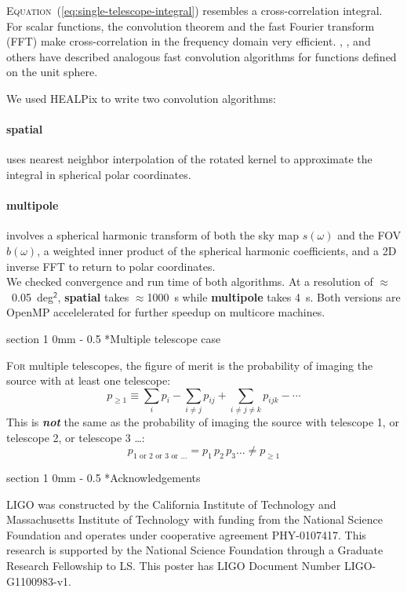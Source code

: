 \documentclass[portrait]{a0poster}
\makeatletter
\newcommand{\dropcap}[2]{\lettrine{\fontspec{Copse}#1}{\textnormal{#2}}}
\renewcommand{\section}{\@startsection
{section}%
{1}%
{0mm}%
{-\baselineskip}%
{0.5\baselineskip}%
{\fontspec{Marvel Bold}\Huge}} %
\renewcommand{\emph}[1]{{\bfseries\itshape#1}}
\makeatother
\begin{document}
\dropcap{E}{quation}~(\ref{eq:single-telescope-integral}) resembles a cross-correlation integral.  For scalar functions, the convolution theorem and the fast Fourier transform (FFT) make cross-correlation in the frequency domain very efficient.  \citet{Driscoll1994202}, \citet{Wandelt:2001p13439}, and others have described analogous fast convolution algorithms for functions defined on the unit sphere.

We used HEALPix to write two convolution algorithms:

\paragraph{spatial} uses nearest neighbor interpolation of the rotated kernel to approximate the integral in spherical polar coordinates.

\paragraph{multipole} involves a spherical harmonic transform of both the sky map $s(\omega)$ and the FOV $b(\omega)$, a weighted inner product of the spherical harmonic coefficients, and a 2D inverse FFT to return to polar coordinates.\\

We checked convergence and run time of both algorithms.  At a resolution of $\approx$~0.05~deg$^\mathsf{2}$, \textbf{spatial} takes $\approx$1000~s while \textbf{multipole} takes 4~s.  Both versions are OpenMP accelelerated for further speedup on multicore machines.

\section*{Multiple telescope case}

\dropcap{F}{or} multiple telescopes, the figure of merit is the probability of imaging the source with at least one telescope:
$$
	p_{\geqslant 1} \equiv \sum_i p_i - \sum_{i \neq j} p_{ij} + \sum_{i \neq j \neq k} p_{ijk} - \cdots
$$
This is \emph{not} the same as the probability of imaging the source with telescope 1, or telescope 2, or telescope 3 \dots :
$$
	p_{1 \textrm{ or } 2 \textrm{ or } 3 \textrm{ or } \dots} = p_1 \, p_2 \, p_3 \dots \neq p_{\geqslant 1}
$$




\section*{Acknowledgements}

LIGO was constructed by the California Institute of Technology and Massachusetts Institute of Technology with funding from the National Science Foundation and operates under cooperative agreement PHY-0107417.  This research is supported by the National Science Foundation through a Graduate Research Fellowship to LS.  This poster has LIGO Document Number LIGO-G1100983-v1.
\end{document}
